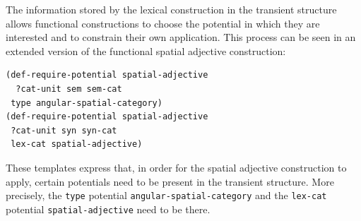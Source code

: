 The information stored by the lexical construction in the transient structure
allows functional constructions to choose 
the potential in which they are interested and to constrain
their own application. This process can be seen in an extended 
version of the functional spatial adjective construction:
\begin{example}
\label{e:def-fun-spatial-adjective-potentials}
\begin{footnotesize}
\begin{Verbatim}[commandchars=\\\{\}]
(def-require-potential spatial-adjective 
  ?cat-unit sem sem-cat 
 type angular-spatial-category)
(def-require-potential spatial-adjective 
 ?cat-unit syn syn-cat
 lex-cat spatial-adjective)
\end{Verbatim}
\end{footnotesize}
\end{example}
These templates express that, in order for the spatial adjective 
construction to apply, certain potentials need to be present in the 
transient structure. More precisely, the {\footnotesize\tt type} potential 
{\footnotesize\tt angular-spatial-category} and the {\footnotesize\tt lex-cat} potential 
{\footnotesize\tt spatial-adjective} need to be there. 

